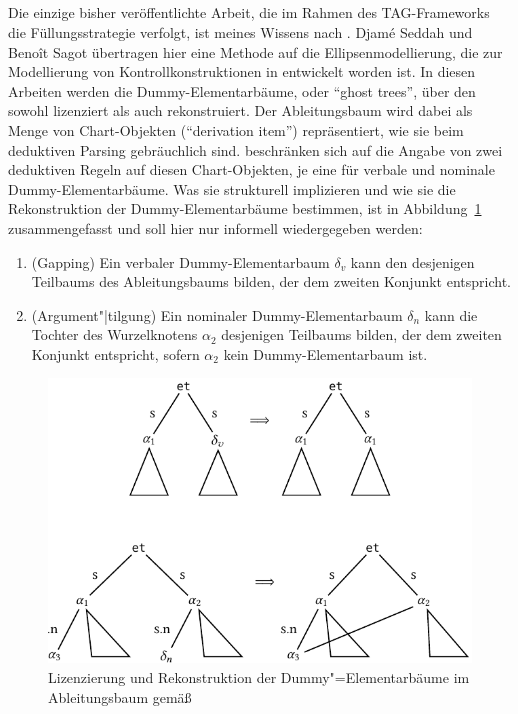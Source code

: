\subsection{\cite{Seddah:Sagot:06}}

Die einzige bisher veröffentlichte Arbeit, die im Rahmen des TAG-Frameworks die Füllungsstrategie verfolgt, ist meines Wissens nach \cite{Seddah:Sagot:06}. Djam\'e Seddah und Beno\^{i}t Sagot übertragen hier eine Methode auf die Ellipsenmodellierung, die zur Modellierung von Kontrollkonstruktionen in \cite{Seddah:Gaiffe:05} entwickelt worden ist. In diesen Arbeiten werden die Dummy-Elementarbäume, oder "`ghost trees"', über den  sowohl lizenziert als auch rekonstruiert. Der Ableitungsbaum wird dabei als Menge von Chart-Objekten ("`derivation item"') repräsentiert, wie sie beim deduktiven Parsing \citep{Shieber:etal:95} gebräuchlich sind. \cite{Seddah:Sagot:06} beschränken sich auf die Angabe von zwei deduktiven Regeln auf diesen Chart-Objekten, je eine für verbale und nominale Dummy-Elementarbäume. Was sie strukturell implizieren und wie sie die Rekonstruktion der Dummy-Elementarbäume bestimmen, ist in Abbildung~\ref{fig-tag-fuellung-2} zusammengefasst und soll hier nur informell wiedergegeben werden:
\begin{enumerate}
  \item (Gapping) Ein verbaler Dummy-Elementarbaum $\delta_v$ kann den  desjenigen Teilbaums des Ableitungsbaums bilden, der dem zweiten Konjunkt entspricht.
  \item (Argument"|tilgung) Ein nominaler Dummy-Elementarbaum $\delta_n$ kann die Tochter des Wurzelknotens $\alpha_2$ desjenigen Teilbaums bilden, der dem zweiten Konjunkt entspricht, sofern $\alpha_2$ kein Dummy-Elementarbaum ist.    
\end{enumerate}
\begin{figure}[t]
\centering
\includegraphics{graphics/abb825.pdf}
\caption{\label{fig-tag-fuellung-2}Lizenzierung und Rekonstruktion der Dummy"=Elementarbäume im Ableitungsbaum gemä\ss\ \cite{Seddah:Sagot:06}}
\end{figure} 
